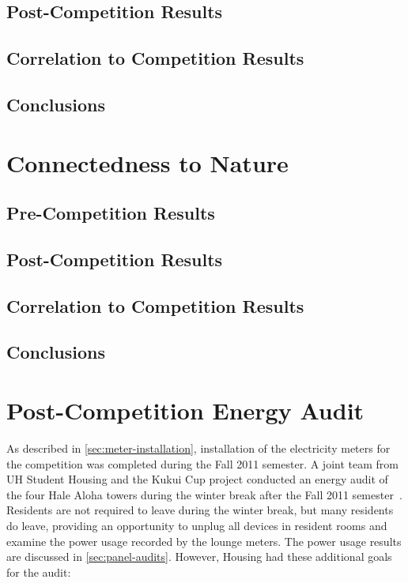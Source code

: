\subsection{Post-Competition Results}

\subsection{Correlation to Competition Results}

\subsection{Conclusions}


\section{Connectedness to Nature}

\subsection{Pre-Competition Results}

\subsection{Post-Competition Results}

\subsection{Correlation to Competition Results}

\subsection{Conclusions}



\section{Post-Competition Energy Audit}
\label{sec:post-energy-audit}

As described in \autoref{sec:meter-installation}, installation of the electricity meters for the competition was completed during the Fall 2011 semester. A joint team from UH \Manoa Student Housing and the Kukui Cup project conducted an energy audit of the four Hale Aloha towers during the winter break after the Fall 2011 semester~\cite{csdl2-11-12}. Residents are not required to leave during the winter break, but many residents do leave, providing an opportunity to unplug all devices in resident rooms and examine the power usage recorded by the lounge meters. The power usage results are discussed in \autoref{sec:panel-audits}. However, Housing had these additional goals for the audit:


